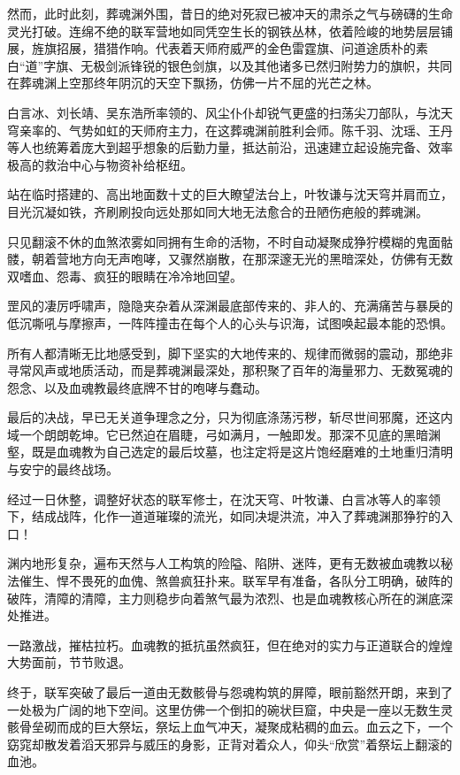 然而，此时此刻，葬魂渊外围，昔日的绝对死寂已被冲天的肃杀之气与磅礴的生命灵光打破。连绵不绝的联军营地如同凭空生长的钢铁丛林，依着险峻的地势层层铺展，旌旗招展，猎猎作响。代表着天师府威严的金色雷霆旗、问道途质朴的素白“道”字旗、无极剑派锋锐的银色剑旗，以及其他诸多已然归附势力的旗帜，共同在葬魂渊上空那终年阴沉的天空下飘扬，仿佛一片不屈的光芒之林。

白言冰、刘长靖、吴东浩所率领的、风尘仆仆却锐气更盛的扫荡尖刀部队，与沈天穹亲率的、气势如虹的天师府主力，在这葬魂渊前胜利会师。陈千羽、沈瑶、王丹等人也统筹着庞大到超乎想象的后勤力量，抵达前沿，迅速建立起设施完备、效率极高的救治中心与物资补给枢纽。

站在临时搭建的、高出地面数十丈的巨大瞭望法台上，叶牧谦与沈天穹并肩而立，目光沉凝如铁，齐刷刷投向远处那如同大地无法愈合的丑陋伤疤般的葬魂渊。

只见翻滚不休的血煞浓雾如同拥有生命的活物，不时自动凝聚成狰狞模糊的鬼面骷髅，朝着营地方向无声咆哮，又骤然崩散，在那深邃无光的黑暗深处，仿佛有无数双嗜血、怨毒、疯狂的眼睛在冷冷地回望。

罡风的凄厉呼啸声，隐隐夹杂着从深渊最底部传来的、非人的、充满痛苦与暴戾的低沉嘶吼与摩擦声，一阵阵撞击在每个人的心头与识海，试图唤起最本能的恐惧。

所有人都清晰无比地感受到，脚下坚实的大地传来的、规律而微弱的震动，那绝非寻常风声或地质活动，而是葬魂渊最深处，那积聚了百年的海量邪力、无数冤魂的怨念、以及血魂教最终底牌不甘的咆哮与蠢动。

最后的决战，早已无关道争理念之分，只为彻底涤荡污秽，斩尽世间邪魔，还这内域一个朗朗乾坤。它已然迫在眉睫，弓如满月，一触即发。那深不见底的黑暗渊壑，既是血魂教为自己选定的最后坟墓，也注定将是这片饱经磨难的土地重归清明与安宁的最终战场。

\vspace{2em}

经过一日休整，调整好状态的联军修士，在沈天穹、叶牧谦、白言冰等人的率领下，结成战阵，化作一道道璀璨的流光，如同决堤洪流，冲入了葬魂渊那狰狞的入口！

渊内地形复杂，遍布天然与人工构筑的险隘、陷阱、迷阵，更有无数被血魂教以秘法催生、悍不畏死的血傀、煞兽疯狂扑来。联军早有准备，各队分工明确，破阵的破阵，清障的清障，主力则稳步向着煞气最为浓烈、也是血魂教核心所在的渊底深处推进。

一路激战，摧枯拉朽。血魂教的抵抗虽然疯狂，但在绝对的实力与正道联合的煌煌大势面前，节节败退。

终于，联军突破了最后一道由无数骸骨与怨魂构筑的屏障，眼前豁然开朗，来到了一处极为广阔的地下空间。这里仿佛一个倒扣的碗状巨窟，中央是一座以无数生灵骸骨垒砌而成的巨大祭坛，祭坛上血气冲天，凝聚成粘稠的血云。血云之下，一个窈窕却散发着滔天邪异与威压的身影，正背对着众人，仰头“欣赏”着祭坛上翻滚的血池。

